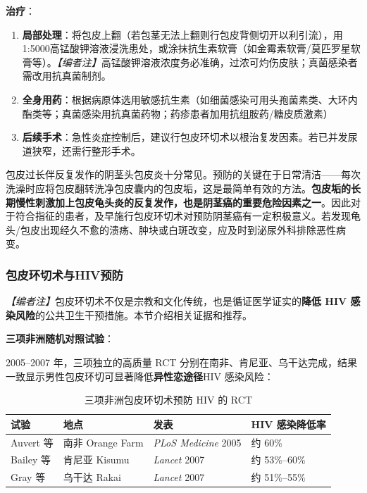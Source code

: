 \vspace{0.5em}
\noindent\textbf{治疗}：
\begin{enumerate}
	\item \textbf{局部处理}：将包皮上翻（若包茎无法上翻则行包皮背侧切开以利引流），用1:5000高锰酸钾溶液浸洗患处，或涂抹抗生素软膏（如金霉素软膏/莫匹罗星软膏等）。\textit{【编者注】}高锰酸钾溶液浓度务必准确，过浓可灼伤皮肤；真菌感染者需改用抗真菌制剂。
	\item \textbf{全身用药}：根据病原体选用敏感抗生素（如细菌感染可用头孢菌素类、大环内酯类等；真菌感染用抗真菌药物；药疹患者加用抗组胺药/糖皮质激素）
	\item \textbf{后续手术}：急性炎症控制后，建议行包皮环切术以根治复发因素。若已并发尿道狭窄，还需行整形手术。
\end{enumerate}

\begin{tcolorbox}[colback=pink!5!white,colframe=red!50!black,title=贴心小叮咛]
包皮过长伴反复发作的阴茎头包皮炎十分常见。预防的关键在于日常清洁——每次洗澡时应将包皮翻转洗净包皮囊内的包皮垢，这是最简单有效的方法。\textbf{包皮垢的长期慢性刺激加上包皮龟头炎的反复发作，也是阴茎癌的重要危险因素之一}。因此对于符合指征的患者，及早施行包皮环切术对预防阴茎癌有一定积极意义。若发现龟头/包皮出现经久不愈的溃疡、肿块或白斑改变，应及时到泌尿外科排除恶性病变。
\end{tcolorbox}

\subsubsection{包皮环切术与HIV预防}
\label{subsec:circumcision_hiv}

\noindent\textit{【编者注】}包皮环切术不仅是宗教和文化传统，也是循证医学证实的\textbf{降低 HIV 感染风险}的公共卫生干预措施。本节介绍相关证据和推荐。

\vspace{0.5em}
\noindent\textbf{三项非洲随机对照试验}：

2005--2007 年，三项独立的高质量 RCT 分别在南非、肯尼亚、乌干达完成，结果一致显示男性包皮环切可显著降低\textbf{异性恋途径}HIV 感染风险：

\begin{table}[htbp]
\centering
\caption{三项非洲包皮环切术预防 HIV 的 RCT}
\label{tab:circumcision_hiv_rct}
\begin{tabularx}{\textwidth}{@{}llXX@{}}
    \toprule
    \textbf{试验} & \textbf{地点} & \textbf{发表} & \textbf{HIV 感染降低率} \\
    \midrule
    Auvert 等 & 南非 Orange Farm & \textit{PLoS Medicine} 2005 & 约 60\% \\
    Bailey 等 & 肯尼亚 Kisumu & \textit{Lancet} 2007 & 约 53\%--60\% \\
    Gray 等 & 乌干达 Rakai & \textit{Lancet} 2007 & 约 51\%--55\% \\
    \bottomrule
\end{tabularx}
\end{table}

